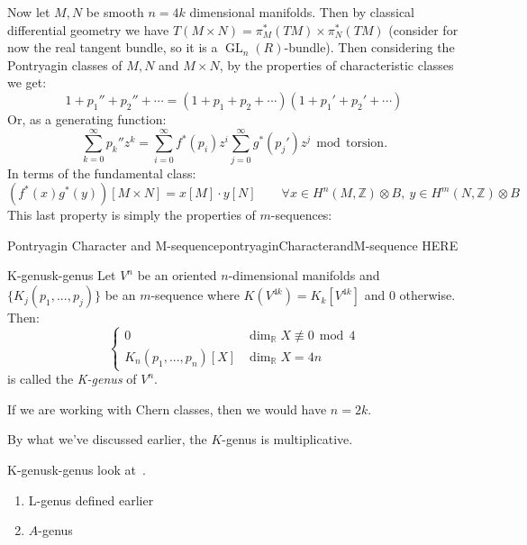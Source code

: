 \documentclass{book}
\newcommand{\R}{{\mathbb{R}}}
\newcommand{\Z}{{\mathbb{Z}}}
\newcommand{\GL}{{\operatorname{GL}}}
\newcommand{\qn}{\quad\newline}
\renewcommand{\mod}{\,\operatorname{mod}\,}
\begin{document}
Now let $M,N$ be smooth $n =4k$ dimensional manifolds. Then by classical differential geometry we have
$T(M\times N) = \pi_M^*(TM)\times \pi_N^*(TM)$ (consider for now the real tangent bundle, so it is
a $\GL_n(R)$-bundle). Then considering the Pontryagin classes of $M,N$ and $M\times N$, by the properties of
characteristic classes we get:
\[
  1 + p_1'' + p_2'' + \cdots = (1 + p_1 + p_2 + \cdots)(1 + p_1' + p_2' + \cdots)
\]
Or, as a generating function:
\[
  \sum_{k=0}^\infty p_k'' z^k = \sum_{i=0}^\infty f^*(p_i) z^i \sum_{j=0}^\infty g^*(p_j') z^j \mod \text{torsion}.
\]
In terms of the fundamental class:
\[
  (f^*(x)g^*(y))[M\times N] = x[M]\cdot y[N] \qquad \forall x \in H^n(M,\Z)\otimes B,\ y \in H^m(N,\Z)\otimes B
\]
This last property is simply the properties of $m$-sequences:

\begin{lem}{Pontryagin Character and M-sequence}{pontryaginCharacterandM-sequence}
  HERE
\end{lem}

\begin{Proof}

\end{Proof}

\begin{defn}{K-genus}{k-genus}
  Let $V^n$ be an oriented $n$-dimensional manifolds and $\{K_j(p_1, ..., p_j)\}$ be an $m$-sequence where
  $K(V^{4k}) = K_k[V^{4k}]$ and $0$ otherwise. Then:
  \[
    \begin{cases}
      0 & \dim_\R X \not\equiv 0 \mod 4\\
      K_n(p_1, ..., p_n)[X] & \dim_\R X = 4n
    \end{cases}
  \]
  is called the \emph{K-genus} of $V^{n}$.

  \qn
  If we are working with Chern classes, then we would have $n=2k$.
\end{defn}

By what we've discussed earlier, the $K$-genus is multiplicative.

\begin{example}{K-genus}{k-genus}
  look at~\cite[p.77]{hirzebruchTopologicalMethodsAlgebraic1995}.
  \begin{enumerate}
    \item L-genus defined earlier
    \item $A$-genus
  \end{enumerate}
\end{example}
\end{document}
